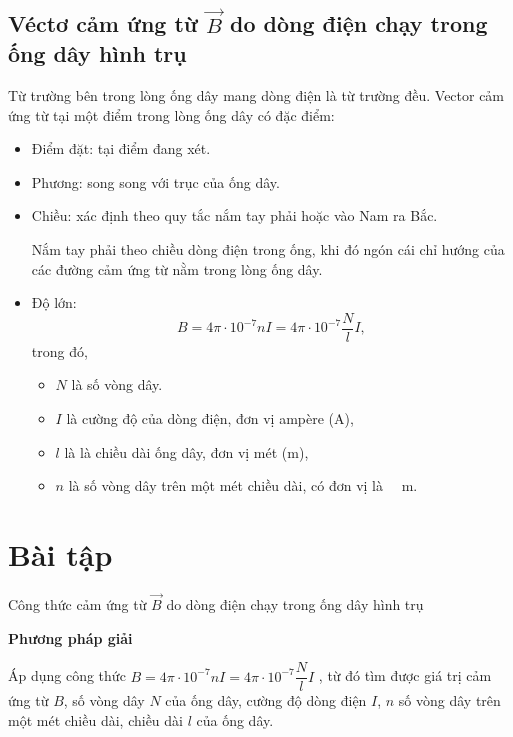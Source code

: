 \subsection{Véctơ cảm ứng từ $\vec{B}$ do dòng điện chạy trong ống dây hình trụ}
Từ trường bên trong lòng ống dây mang dòng điện là từ trường đều. Vector cảm ứng từ tại một điểm trong lòng ống dây có đặc điểm: 
\begin{itemize}
	\item Điểm đặt: tại điểm đang xét.
	\item Phương: song song với trục của ống dây. 
	\item Chiều: xác định theo quy tắc nắm tay phải hoặc vào Nam ra Bắc.
	
	Nắm tay phải theo chiều dòng điện trong ống, khi đó ngón cái chỉ hướng của các đường cảm ứng từ nằm trong lòng ống dây.
	
	\item Độ lớn:  
	\begin{equation}
	B=4\pi\cdot 10^{-7}nI=4\pi\cdot 10^{-7}\dfrac{N}{l}I,
	\end{equation}
	trong đó,
	\begin{itemize}
		\item $N$ là số vòng dây.
		\item $I$ là cường độ của dòng điện, đơn vị ampère (A), 
		\item $l$ là là chiều dài ống dây, đơn vị mét (m),  
		\item $n$ là số vòng dây trên một mét chiều dài, có đơn vị là \SI{}{\per\meter}.
	\end{itemize}
	
\end{itemize}


\section{Bài tập}
\begin{dang}{Công thức cảm ứng từ $\vec{B}$ do dòng điện chạy trong ống dây hình trụ}
\end{dang}

\textbf{Phương pháp giải}

Áp dụng công thức $B=4\pi\cdot 10^{-7}nI=4\pi\cdot 10^{-7}\dfrac{N}{l}I$  , từ đó tìm được giá trị cảm ứng từ $B$, số vòng dây $N$ của ống dây, cường độ dòng điện $I$, $n$ số vòng dây trên một mét chiều dài, chiều dài $l$ của ống dây.





